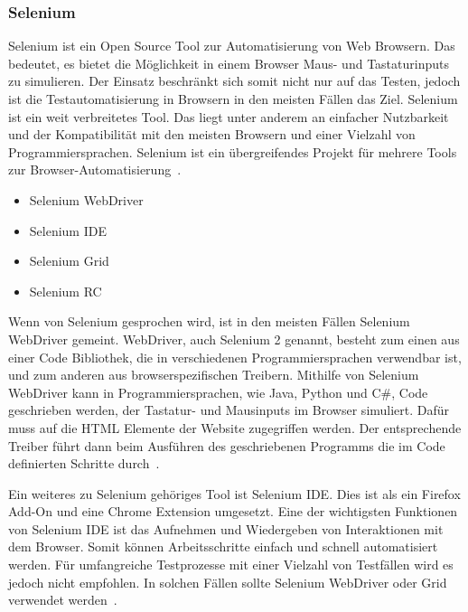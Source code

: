 \subsubsection{Selenium}
Selenium ist ein Open Source Tool zur Automatisierung von Web Browsern. Das bedeutet, es bietet die Möglichkeit in einem Browser Maus- und Tastaturinputs zu simulieren. Der Einsatz beschränkt sich somit nicht nur auf das Testen, jedoch ist die Testautomatisierung in Browsern in den meisten Fällen das Ziel. Selenium ist ein weit verbreitetes Tool. Das liegt unter anderem an einfacher Nutzbarkeit und der Kompatibilität mit den meisten Browsern und einer Vielzahl von Programmiersprachen. Selenium ist ein übergreifendes Projekt für mehrere Tools zur Browser-Automatisierung~\cite{Axelrod.2018}.
\newline

\begin{itemize}
	
	\item Selenium WebDriver
	
	\item Selenium \ac{IDE}
	
	\item Selenium Grid
	
	\item Selenium \ac{RC}
	
\end{itemize}

Wenn von Selenium gesprochen wird, ist in den meisten Fällen Selenium WebDriver gemeint. WebDriver, auch Selenium 2 genannt, besteht zum einen aus einer Code Bibliothek, die in verschiedenen Programmiersprachen verwendbar ist, und zum anderen aus browserspezifischen Treibern. 
\newline
Mithilfe von Selenium WebDriver kann in Programmiersprachen, wie Java, Python und C\#, Code geschrieben werden, der Tastatur- und Mausinputs im Browser simuliert. Dafür muss auf die \ac{HTML} Elemente der Website zugegriffen werden. Der entsprechende Treiber führt dann beim Ausführen des geschriebenen Programms die im Code definierten Schritte durch~\cite{selenium.webdriver}.
\newline


Ein weiteres zu Selenium gehöriges Tool ist Selenium \ac{IDE}. Dies ist als ein Firefox Add-On und eine Chrome Extension umgesetzt. Eine der wichtigsten Funktionen von Selenium \ac{IDE} ist das Aufnehmen und Wiedergeben von Interaktionen mit dem Browser. Somit können Arbeitsschritte einfach und schnell automatisiert werden. Für umfangreiche Testprozesse mit einer Vielzahl von Testfällen wird es jedoch nicht empfohlen. In solchen Fällen sollte Selenium WebDriver oder Grid verwendet werden~\cite{selenium.ide}.
\newline


